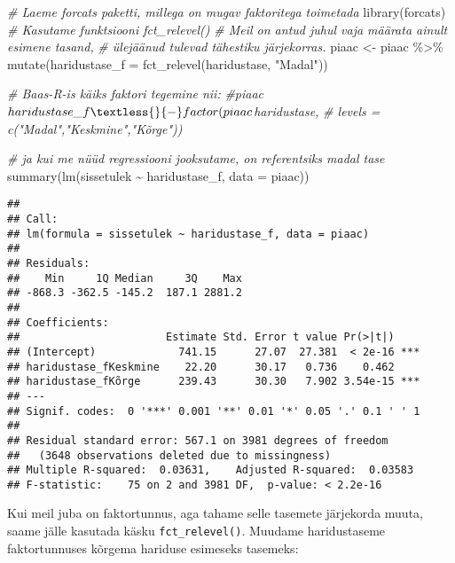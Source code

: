 \documentclass[
]{book}
\newenvironment{Shaded}{\begin{snugshade}}{\end{snugshade}}
\newcommand{\AttributeTok}[1]{\textcolor[rgb]{0.77,0.63,0.00}{#1}}
\newcommand{\CommentTok}[1]{\textcolor[rgb]{0.56,0.35,0.01}{\textit{#1}}}
\newcommand{\FunctionTok}[1]{\textcolor[rgb]{0.00,0.00,0.00}{#1}}
\newcommand{\NormalTok}[1]{#1}
\newcommand{\OtherTok}[1]{\textcolor[rgb]{0.56,0.35,0.01}{#1}}
\newcommand{\SpecialCharTok}[1]{\textcolor[rgb]{0.00,0.00,0.00}{#1}}
\newcommand{\StringTok}[1]{\textcolor[rgb]{0.31,0.60,0.02}{#1}}
\begin{document}
\begin{Shaded}
\begin{Highlighting}[]
\CommentTok{\# Laeme forcats paketti, millega on mugav faktoritega toimetada}
\FunctionTok{library}\NormalTok{(forcats)}
\CommentTok{\# Kasutame funktsiooni fct\_relevel()}
\CommentTok{\# Meil on antud juhul vaja määrata ainult esimene tasand,}
\CommentTok{\#  ülejäänud tulevad tähestiku järjekorras.}
\NormalTok{piaac }\OtherTok{\textless{}{-}}\NormalTok{ piaac }\SpecialCharTok{\%\textgreater{}\%} 
  \FunctionTok{mutate}\NormalTok{(}\AttributeTok{haridustase\_f =} \FunctionTok{fct\_relevel}\NormalTok{(haridustase, }\StringTok{"Madal"}\NormalTok{))}

\CommentTok{\# Baas{-}R{-}is käiks faktori tegemine nii:}
\CommentTok{\#piaac$haridustase\_f \textless{}{-} factor(piaac$haridustase, }
\CommentTok{\#                              levels = c("Madal","Keskmine","Kõrge"))}

\CommentTok{\# ja kui me nüüd regressiooni jooksutame, on referentsiks madal tase}
\FunctionTok{summary}\NormalTok{(}\FunctionTok{lm}\NormalTok{(sissetulek }\SpecialCharTok{\textasciitilde{}}\NormalTok{ haridustase\_f, }\AttributeTok{data =}\NormalTok{ piaac))}
\end{Highlighting}
\end{Shaded}

\begin{verbatim}
## 
## Call:
## lm(formula = sissetulek ~ haridustase_f, data = piaac)
## 
## Residuals:
##    Min     1Q Median     3Q    Max 
## -868.3 -362.5 -145.2  187.1 2881.2 
## 
## Coefficients:
##                       Estimate Std. Error t value Pr(>|t|)    
## (Intercept)             741.15      27.07  27.381  < 2e-16 ***
## haridustase_fKeskmine    22.20      30.17   0.736    0.462    
## haridustase_fKõrge      239.43      30.30   7.902 3.54e-15 ***
## ---
## Signif. codes:  0 '***' 0.001 '**' 0.01 '*' 0.05 '.' 0.1 ' ' 1
## 
## Residual standard error: 567.1 on 3981 degrees of freedom
##   (3648 observations deleted due to missingness)
## Multiple R-squared:  0.03631,    Adjusted R-squared:  0.03583 
## F-statistic:    75 on 2 and 3981 DF,  p-value: < 2.2e-16
\end{verbatim}

Kui meil juba on faktortunnus, aga tahame selle tasemete järjekorda muuta, saame jälle kasutada käsku \texttt{fct\_relevel()}. Muudame haridustaseme faktortunnuses kõrgema hariduse esimeseks tasemeks:
\end{document}
